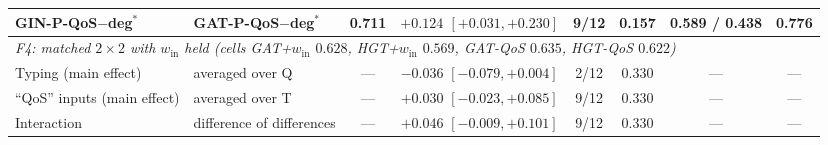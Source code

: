 \documentclass[preprint,3p]{elsarticle}
\begin{document}
\begin{table}[htbp]
{\begin{tabular}{llcccccc}
GIN-P-QoS$-$deg$^*$ & GAT-P-QoS$-$deg$^*$ & 0.711 & $+0.124$ $[+0.031, +0.230]$ & 9/12 & 0.157 & 0.589 / 0.438 & 0.776 \\
\midrule
\multicolumn{8}{l}{\textit{F4: matched $2\times2$ with $w_{\text{in}}$ held (cells GAT+$w_{\text{in}}$ $0.628$, HGT+$w_{\text{in}}$ $0.569$, GAT-QoS $0.635$, HGT-QoS $0.622$)}} \\
Typing (main effect) & averaged over Q & --- & $-0.036$ $[-0.079, +0.004]$ & 2/12 & 0.330 & --- & --- \\
``QoS'' inputs (main effect) & averaged over T & --- & $+0.030$ $[-0.023, +0.085]$ & 9/12 & 0.330 & --- & --- \\
Interaction & difference of differences & --- & $+0.046$ $[-0.009, +0.101]$ & 9/12 & 0.330 & --- & --- \\
\bottomrule
\end{tabular}%
}
\end{table}
\end{document}
